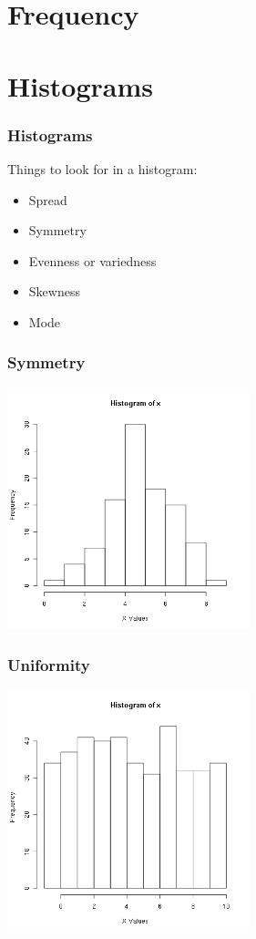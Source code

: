 \section{Frequency}
\section{Histograms}

\begin{frame}
  \frametitle{Histograms}

  Things to look for in a histogram:\\
  \begin{itemize}
  \item Spread
  \item Symmetry
  \item Evenness or variedness
  \item Skewness
  \item Mode
  \end{itemize}

\end{frame}


\begin{frame}
  \frametitle{Symmetry}

  \includegraphics[width=7cm]{img/symmetricW1D2}

\end{frame}

\begin{frame}
  \frametitle{Uniformity}

  \includegraphics[width=7cm]{img/uniformW1D2}

\end{frame}



